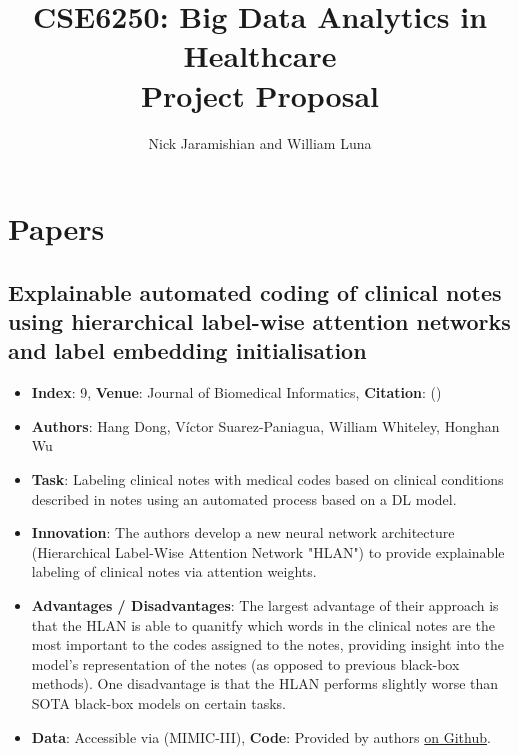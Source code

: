 \documentclass[
	letterpaper, %
]{jdf}
\title{CSE6250: Big Data Analytics in Healthcare \\ Project Proposal}
\author{Nick Jaramishian and William Luna}
\newcommand{\pcite}[1]{(\cite{#1})}
\begin{document}
\maketitle

\section{Papers}

\subsection{Explainable automated coding of clinical notes using hierarchical label-wise attention networks and label embedding initialisation}
\begin{itemize}[noitemsep,topsep=0pt,parsep=0pt,partopsep=0pt]
\item \textbf{Index}: 9, \textbf{Venue}: Journal of Biomedical Informatics, \textbf{Citation}: \pcite{explainable_note_coding}
\item \textbf{Authors}: Hang Dong, Víctor Suarez-Paniagua, William Whiteley, Honghan Wu 
\item \textbf{Task}: Labeling clinical notes with medical codes based on clinical conditions described in notes using an automated process based on a DL model.
\item \textbf{Innovation}: The authors develop a new neural network architecture (Hierarchical Label-Wise Attention Network "HLAN") to provide explainable labeling of clinical notes via attention weights. 
\item \textbf{Advantages / Disadvantages}: The largest advantage of their approach is that the HLAN is able to quanitfy which words in the clinical notes are the most important to the codes assigned to the notes, providing insight into the model's representation of the notes (as opposed to previous black-box methods). One disadvantage is that the HLAN performs slightly worse than SOTA black-box models on certain tasks. 
\item \textbf{Data}: Accessible via (MIMIC-III), \textbf{Code}: Provided by authors \href{https://github.com/acadTags/Explainable-Automated-Medical-Coding}{on Github}.
\end{itemize}
\end{document}
